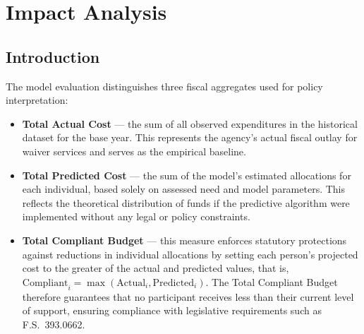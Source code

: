 ﻿\chapter{Impact Analysis}\newpage

\section{Introduction}

The model evaluation distinguishes three fiscal aggregates used for policy interpretation: 

\begin{itemize}
    \item \textbf{Total Actual Cost} --- the sum of all observed expenditures in the historical dataset for the base year.  This represents the agency's actual fiscal outlay for waiver services and serves as the empirical baseline.  
    \item \textbf{Total Predicted Cost} --- the sum of the model's estimated allocations for each individual, based solely on assessed need and model parameters.  This reflects the theoretical distribution of funds if the predictive algorithm were implemented without any legal or policy constraints.  
    \item \textbf{Total Compliant Budget} --- this measure enforces statutory protections against reductions in individual allocations by setting each person's projected cost to the greater of the actual and predicted values, that is, 
    $\text{Compliant}_i = \max(\text{Actual}_i, \text{Predicted}_i)$.  
    The Total Compliant Budget therefore guarantees that no participant receives less than their current level of support, ensuring compliance with legislative requirements such as F.S.~393.0662.  
\end{itemize}

 